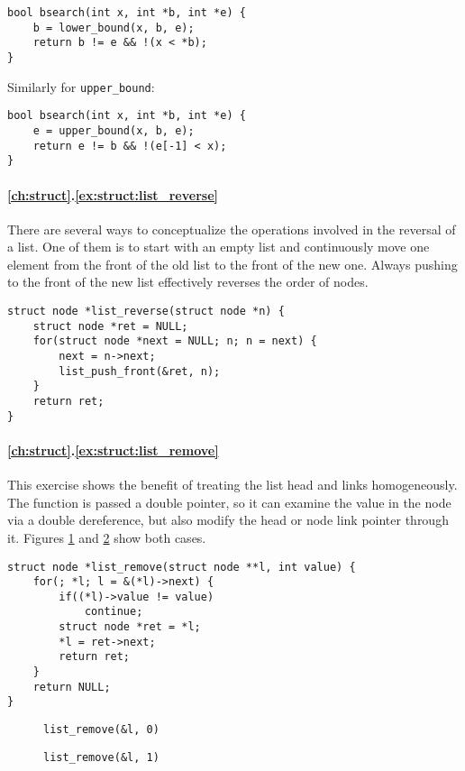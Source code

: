 \begin{lstlisting}[style=c]
bool bsearch(int x, int *b, int *e) {
    b = lower_bound(x, b, e);
    return b != e && !(x < *b);
}
\end{lstlisting}

Similarly for \texttt{upper\_bound}:

\begin{lstlisting}[style=c]
bool bsearch(int x, int *b, int *e) {
    e = upper_bound(x, b, e);
    return e != b && !(e[-1] < x);
}
\end{lstlisting}

\paragraph{\ref{ch:struct}.\ref{ex:struct:list_reverse}}

There are several ways to conceptualize the operations involved in the reversal
of a list.  One of them is to start with an empty list and continuously move one
element from the front of the old list to the front of the new one.  Always
pushing to the front of the new list effectively reverses the order of nodes.

\begin{lstlisting}[style=c]
struct node *list_reverse(struct node *n) {
    struct node *ret = NULL;
    for(struct node *next = NULL; n; n = next) {
        next = n->next;
        list_push_front(&ret, n);
    }
    return ret;
}
\end{lstlisting}

\paragraph{\ref{ch:struct}.\ref{ex:struct:list_remove}}

This exercise shows the benefit of treating the list head and links
homogeneously.  The function is passed a double pointer, so it can examine the
value in the node via a double dereference, but also modify the head or node
link pointer through it.  Figures \ref{fig:sol:list_remove0} and
\ref{fig:sol:list_remove1} show both cases.

\begin{lstlisting}[style=c]
struct node *list_remove(struct node **l, int value) {
    for(; *l; l = &(*l)->next) {
        if((*l)->value != value)
            continue;
        struct node *ret = *l;
        *l = ret->next;
        return ret;
    }
    return NULL;
}
\end{lstlisting}

\begin{figure}[p]
    \centering
    
    \caption{\texttt{list\_remove(\&l, 0)}}
    \label{fig:sol:list_remove0}
\end{figure}

\begin{figure}[p]
    \centering
    
    \caption{\texttt{list\_remove(\&l, 1)}}
    \label{fig:sol:list_remove1}
\end{figure}
